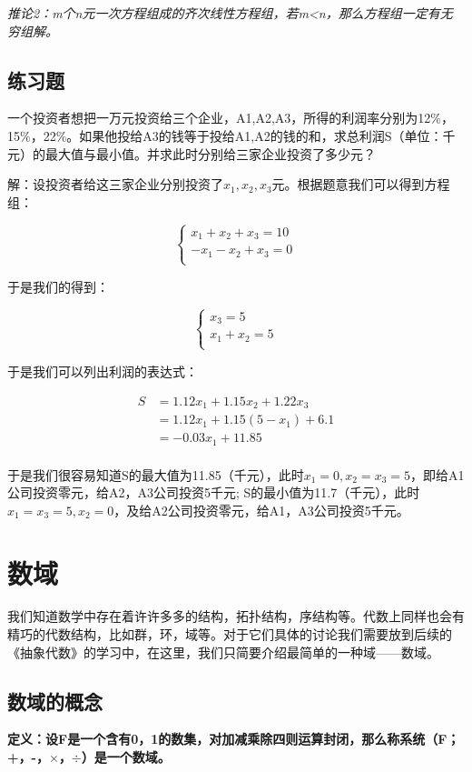 \documentclass[a4paper]{ctexart}
\begin{document}
\textit{推论2：m个n元一次方程组成的齐次线性方程组，若m<n，那么方程组一定有无穷组解。}

\subsection{练习题}

一个投资者想把一万元投资给三个企业，A1,A2,A3，所得的利润率分别为12$\%$，15$\%$，22$\%$。如果他投给A3的钱等于投给A1,A2的钱的和，求总利润S（单位：千元）的最大值与最小值。并求此时分别给三家企业投资了多少元？

解：设投资者给这三家企业分别投资了$x_{1},x_{2},x_{3}$元。根据题意我们可以得到方程组：

$$
\begin{cases}
x_{1}+x_{2}+x_{3}=10\\
-x_{1}-x_{2}+x_{ 3}=0\\
\end{cases}
$$

于是我们的得到：

$$
\begin{cases}
x_{3}=5\\
x_{1}+x_{2}=5\\
\end{cases}
$$

于是我们可以列出利润的表达式：

$$
\begin{aligned}
S&=1.12x_{1}+1.15x_{2}+1.22x_{3}\\
  &=1.12x_{1}+1.15(5-x_{1})+6.1\\
  &=-0.03x_{1}+11.85\\
\end{aligned}
$$

 于是我们很容易知道S的最大值为11.85（千元），此时$x_{1}=0,x_{2}=x_{3}=5$，即给A1公司投资零元，给A2，A3公司投资5千元;
 S的最小值为11.7（千元），此时$x_{1}=x_{3}=5,x_{2}=0$，及给A2公司投资零元，给A1，A3公司投资5千元。
 

\section{数域}
我们知道数学中存在着许许多多的结构，拓扑结构，序结构等。代数上同样也会有精巧的代数结构，比如群，环，域等。对于它们具体的讨论我们需要放到后续的《抽象代数》的学习中，在这里，我们只简要介绍最简单的一种域——数域。

\subsection{数域的概念}
\textbf{定义：设F是一个含有0，1的数集，对加减乘除四则运算封闭，那么称系统（F；+，-，$\times$，$\div$）是一个数域。}
\end{document}
